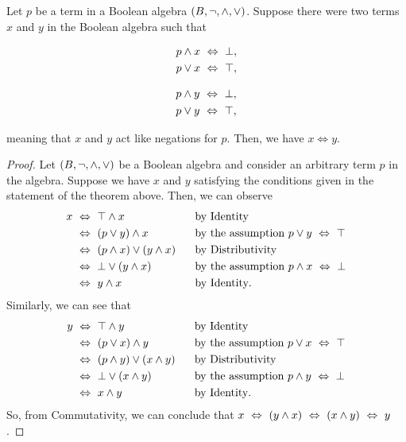\begin{theorem}\label{thm:unique}
    Let $p$ be a term in a Boolean algebra $(B, \neg, \wedge, \vee)$.
    Suppose there were two terms $x$ and $y$ in the Boolean algebra such that
    \begin{center}
        \vspace{-\parskip-\abovedisplayskip}
        \begin{minipage}{.2\linewidth}
            \begin{align*}
                p \wedge x &~\Leftrightarrow~ \bot,\\
                p \vee x &~\Leftrightarrow~ \top,
            \end{align*}
        \end{minipage}%
        \begin{minipage}{.2\linewidth}
            \begin{align*}
                p \wedge y &~\Leftrightarrow~ \bot,\\
                p \vee y &~\Leftrightarrow~ \top,
            \end{align*}
        \end{minipage}
    \end{center}
    meaning that $x$ and $y$ act like negations for $p$.
    Then, we have $x \iff y$.
\end{theorem}
\begin{proof}
    Let $(B, \neg, \wedge, \vee)$ be a Boolean algebra
    and consider an arbitrary term $p$ in the algebra.
    Suppose we have $x$ and $y$ satisfying the conditions given in the statement of the theorem above.
    Then, we can observe
    \begin{alignat*}{2}
        x &~\Leftrightarrow~ \top \wedge x ~~~~~~~~~~~~~~~~&&\text{by Identity}\\
          &~\Leftrightarrow~ (p \vee y) \wedge x &&\text{by the assumption $p \vee y ~\Leftrightarrow~ \top$}\\
          &~\Leftrightarrow~ (p \wedge x) \vee (y \wedge x) &&\text{by Distributivity}\\
          &~\Leftrightarrow~ \bot \vee (y \wedge x) &&\text{by the assumption $p \wedge x ~\Leftrightarrow~ \bot$}\\
          &~\Leftrightarrow~ y \wedge x &&\text{by Identity}.
    \end{alignat*}
    Similarly, we can see that
    \begin{alignat*}{2}
        y &~\Leftrightarrow~ \top \wedge y ~~~~~~~~~~~~~~~~&&\text{by Identity}\\
          &~\Leftrightarrow~ (p \vee x) \wedge y &&\text{by the assumption $p \vee x ~\Leftrightarrow~ \top$}\\
          &~\Leftrightarrow~ (p \wedge y) \vee (x \wedge y) &&\text{by Distributivity}\\
          &~\Leftrightarrow~ \bot \vee (x \wedge y) &&\text{by the assumption $p \wedge y ~\Leftrightarrow~ \bot$}\\
          &~\Leftrightarrow~ x \wedge y &&\text{by Identity}.
    \end{alignat*}
    So, from Commutativity, we can conclude that $x ~\Leftrightarrow~ (y \wedge x) ~\Leftrightarrow~ (x \wedge y) ~\Leftrightarrow~ y$.
\end{proof}

